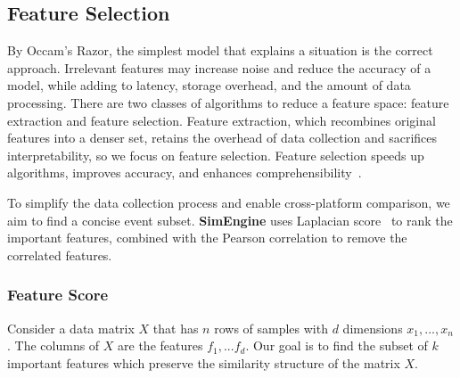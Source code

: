 \documentclass[conference]{IEEEtran}
\newcommand{\us}{\textbf{SimEngine}\xspace}
\newcommand{\eg}                {\emph{e.g.},\xspace}
\newcommand{\avani}[1]          {\textcolor{darkslateblue}{[Avani:#1]}}
\begin{document}
\subsection{Feature Selection}
By Occam’s Razor, the simplest model that explains a situation is the correct approach. 
Irrelevant features may increase noise and reduce the accuracy of a model, while adding to latency, storage overhead, and the amount of data processing. There are two classes of algorithms to reduce a feature space: feature extraction and feature selection. 
Feature extraction, which recombines original features into a denser set,  retains the overhead of data collection and sacrifices interpretability, so we focus on feature selection.
Feature selection speeds up algorithms, improves accuracy, and enhances comprehensibility~\cite{guyon2003introduction}. 


To simplify the data collection process and enable cross-platform comparison, we aim to find a concise event subset. \us uses Laplacian score~\cite{he2005laplacian} to rank the important features, combined with the Pearson correlation to remove the correlated features.

\subsubsection{Feature Score}
\label{sec:feature_score}
Consider a data matrix $X$ that has $n$ rows of samples with $d$ dimensions $x_{1},...,x_{n}$. The columns of $X$ are the features $f_{1},...f_{d}$. Our goal is to find the subset of $k$ important features which preserve the similarity structure of the matrix $X$. 
\end{document}
